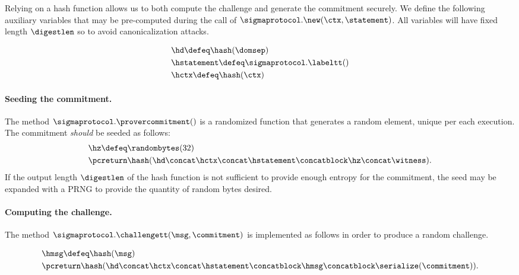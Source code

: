 \documentclass[11pt]{article}
\begin{document}
Relying on a hash function allows us to both compute the challenge and generate the commitment securely.
We define the following auxiliary variables that may be pre-computed during the call of $\sigmaprotocol.\new(\ctx, \statement)$. All variables will have fixed length $\digestlen$ so to avoid
canonicalization attacks.

\[
  \begin{aligned}
   & \hd \defeq \hash(\domsep) \\
   & \hstatement \defeq \sigmaprotocol.\labeltt() \\
   & \hctx \defeq \hash(\ctx)
  \end{aligned}
\]
\paragraph{Seeding the commitment.} The method $\sigmaprotocol.\provercommitment()$ is a randomized function that generates a random element, unique per each execution. The commitment \emph{should} be seeded as follows:
\[
    \begin{aligned}
     & \hz \defeq \randombytes(32) \\
    & \pcreturn  \hash(\hd \concat \hctx \concat \hstatement \concatblock \hz\concat \witness).
    \end{aligned}
    \]
If the output length $\digestlen$ of the hash function is not sufficient to provide enough entropy for the commitment, the seed may be expanded with a PRNG to provide the quantity of random bytes desired.
\paragraph{Computing the challenge.}
The method $\sigmaprotocol.\challengett(\msg, \commitment)$ is implemented as follows in order to produce a random challenge.

  \[
    \begin{aligned}
     & \hmsg \defeq \hash(\msg) \\
    & \pcreturn  \hash(\hd \concat \hctx \concat \hstatement \concatblock \hmsg \concatblock  \serialize(\commitment)).
    \end{aligned}
  \]
\end{document}

